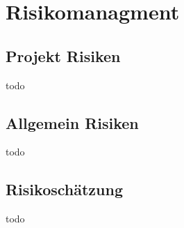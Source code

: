 \section{Risikomanagment}
\label{sec:Risikomanagment}

\subsection{Projekt Risiken}
todo

\subsection{Allgemein Risiken}
todo

\subsection{Risikoschätzung}
todo

